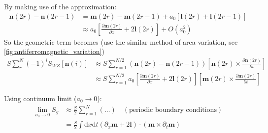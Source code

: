

By making use of the approximation:
\begin{equation}
\begin{aligned}
\bm{n}(2r) - \bm{n}(2r-1) &= \bm{m}(2r) - \bm{m}(2r-1) + a_0 [\bm{l}(2r) + \bm{l}(2r-1)] \\
&\approx a_0 \left[ \frac{\partial \bm{m}(2r)}{\partial x} + 2 \bm{l}(2r) \right] + O(a_0^2)
\end{aligned}
\end{equation}
So the geometric term becomes (use the similar method of area variation, see \cref{fig:antiferromagnetic_variation})
\begin{equation}
\begin{aligned}
S \sum_r^N (-1)^i S_{WZ}[\bm{n}(i)] 
&\approx S \sum_{r=1}^{N/2} (\bm{n}(2r) - \bm{n}(2r-1)) [\bm{n}(2r) \times \frac{\partial \bm{n}(2r)}{\partial t}] \\
&\approx S \sum_{r=1}^{N/2} a_0 \left[ \frac{\partial \bm{m}(2r)}{\partial x} + 2 \bm{l}(2r) \right] \left[ \bm{m}(2r) \times \frac{\partial \bm{m}(2r)}{\partial t} \right]
\end{aligned}
\end{equation}



Using continuum limit ($a_0 \to 0$):
\begin{equation}
\begin{aligned}
\lim_{a_0 \to 0} S_g 
&\approx \frac{S}{2} \sum_{r=1}^N (\dots) \quad (\text{periodic boundary conditions}) \\
&= \frac{S}{2} \int \mathrm{d}x \mathrm{d}t (\partial_x \bm{m} + 2 \bm{l}) \cdot (\bm{m} \times \partial_t \bm{m})
\end{aligned}
\end{equation}

